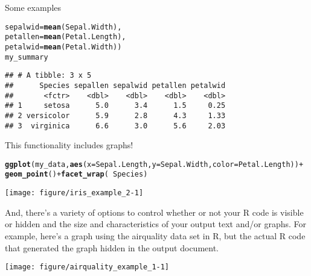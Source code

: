 \documentclass[final]{beamer}\usepackage[]{graphicx}\usepackage[]{color}
\makeatletter
\newcommand{\hlopt}[1]{\textcolor[rgb]{0,0,0}{#1}}%
\newcommand{\hlstd}[1]{\textcolor[rgb]{0.345,0.345,0.345}{#1}}%
\newcommand{\hlkwc}[1]{\textcolor[rgb]{0.333,0.667,0.333}{#1}}%
\newcommand{\hlkwd}[1]{\textcolor[rgb]{0.737,0.353,0.396}{\textbf{#1}}}%
\newenvironment{kframe}{%
 \def\at@end@of@kframe{}%
 \ifinner\ifhmode%
  \def\at@end@of@kframe{\end{minipage}}%
  \begin{minipage}{\columnwidth}%
 \fi\fi%
 \def\FrameCommand##1{\hskip\@totalleftmargin \hskip-\fboxsep
 \colorbox{shadecolor}{##1}\hskip-\fboxsep
     \hskip-\linewidth \hskip-\@totalleftmargin \hskip\columnwidth}%
 \MakeFramed {\advance\hsize-\width
   \@totalleftmargin\z@ \linewidth\hsize
   \@setminipage}}%
 {\par\unskip\endMakeFramed%
 \at@end@of@kframe}
\newenvironment{knitrout}{}{} %
\newlength{\twocolwid}
\makeatother
\begin{document}
\begin{frame}[t, fragile]
\begin{columns}[T]
\begin{column}{\twocolwid}
\begin{block}{Some examples}
\begin{knitrout}
\begin{kframe}
\begin{alltt}
                                                         \hlkwc{sepalwid}\hlstd{=}\hlkwd{mean}\hlstd{(Sepal.Width),}
                                                         \hlkwc{petallen}\hlstd{=}\hlkwd{mean}\hlstd{(Petal.Length),}
                                                         \hlkwc{petalwid}\hlstd{=}\hlkwd{mean}\hlstd{(Petal.Width))}
\hlstd{my_summary}
\end{alltt}
\begin{verbatim}
## # A tibble: 3 x 5
##      Species sepallen sepalwid petallen petalwid
##       <fctr>    <dbl>    <dbl>    <dbl>    <dbl>
## 1     setosa      5.0      3.4      1.5     0.25
## 2 versicolor      5.9      2.8      4.3     1.33
## 3  virginica      6.6      3.0      5.6     2.03
\end{verbatim}
\end{kframe}
\end{knitrout}

This functionality includes graphs!
\begin{knitrout}\tiny
{}\color{fgcolor}\begin{kframe}
\begin{alltt}
\hlkwd{ggplot}\hlstd{(my_data,} \hlkwd{aes}\hlstd{(}\hlkwc{x}\hlstd{=Sepal.Length,} \hlkwc{y}\hlstd{=Sepal.Width,} \hlkwc{color}\hlstd{=Petal.Length))} \hlopt{+}
     \hlkwd{geom_point}\hlstd{()} \hlopt{+} \hlkwd{facet_wrap}\hlstd{(}\hlopt{~}\hlstd{Species)}
\end{alltt}
\end{kframe}
\texttt{[image: figure/iris\_example\_2-1]} 

\end{knitrout}

And, there's a variety of options to control whether or not your R code is visible or hidden and the size and characteristics of your output text and/or graphs. For example, here's a graph using the airquality data set in R, but the actual R code that generated the graph hidden in the output document.

\begin{knitrout}
\color{fgcolor}\begin{kframe}


{\ttfamily\noindent\itshape\color{messagecolor}{\#\# Picking joint bandwidth of 2.65}}\end{kframe}
\texttt{[image: figure/airquality\_example\_1-1]} 


\end{knitrout}
\end{block}
\end{column}
\end{columns}
\end{frame}
\end{document}
